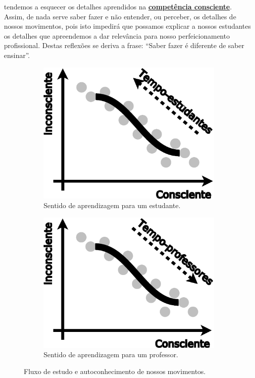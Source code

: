 tendemos a esquecer os detalhes aprendidos na \hyperref[ref:CompetenciaConsciente]{\textbf{competência consciente}}.
Assim, de nada serve saber fazer e não entender, ou perceber, os detalhes de nossos movimentos,
pois isto impedirá que possamos explicar a nossos estudantes os detalhes que apreendemos 
a dar relevância para nosso perfeicionamento profissional.
Destas reflexões se deriva a frase: ``Saber fazer é diferente de saber ensinar''.
\begin{figure}[ht]
\centering
    \begin{subfigure}{.32\textwidth}
      \centering
      \includegraphics[width=.975\linewidth]{chapters/cap-musicalidade-tecnica/tecnica-emotion-5a}  
      \caption{Sentido de aprendizagem para um estudante.}
      \label{fig:tecnica-emotion-5:a}
    \end{subfigure}
    \qquad
    \begin{subfigure}{.32\textwidth}
      \centering
      \includegraphics[width=.975\linewidth]{chapters/cap-musicalidade-tecnica/tecnica-emotion-5b}  
      \caption{Sentido de aprendizagem para um professor.}
      \label{fig:tecnica-emotion-5:b}
    \end{subfigure}
    \caption{Fluxo de estudo e autoconhecimento de nossos movimentos.}
    \label{fig:tecnica-emotion-5}
\end{figure}


